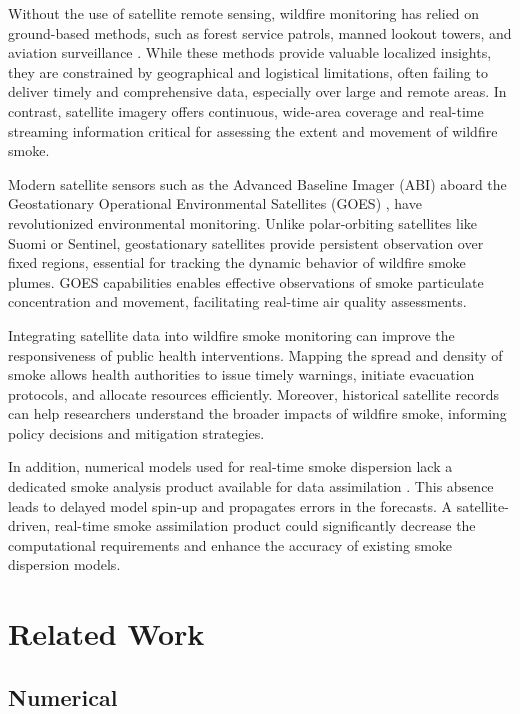 \documentclass{article}
\begin{document}
Without the use of satellite remote sensing, wildfire monitoring has relied on ground-based methods, such as forest service patrols, manned lookout towers, and aviation surveillance \cite{smoke_monitoring}. While these methods provide valuable localized insights, they are constrained by geographical and logistical limitations, often failing to deliver timely and comprehensive data, especially over large and remote areas. In contrast, satellite imagery offers continuous, wide-area coverage and real-time streaming information critical for assessing the extent and movement of wildfire smoke.

Modern satellite sensors such as the Advanced Baseline Imager (ABI) aboard the Geostationary Operational Environmental Satellites (GOES) \cite{goes}, have revolutionized environmental monitoring. Unlike polar-orbiting satellites like Suomi or Sentinel, geostationary satellites provide persistent observation over fixed regions, essential for tracking the dynamic behavior of wildfire smoke plumes. GOES capabilities enables effective observations of smoke particulate concentration and movement, facilitating real-time air quality assessments.

Integrating satellite data into wildfire smoke monitoring can improve the responsiveness of public health interventions. Mapping the spread and density of smoke allows health authorities to issue timely warnings, initiate evacuation protocols, and allocate resources efficiently. Moreover, historical satellite records can help researchers understand the broader impacts of wildfire smoke, informing policy decisions and mitigation strategies.

In addition, numerical models used for real-time smoke dispersion lack a dedicated smoke analysis product available for data assimilation \cite{hrrr, rrfs}. This absence leads to delayed model spin-up and propagates errors in the forecasts. A satellite-driven, real-time smoke assimilation product could significantly decrease the computational requirements and enhance the accuracy of existing smoke dispersion models. 

\section{Related Work}

\subsection{Numerical}
\end{document}
